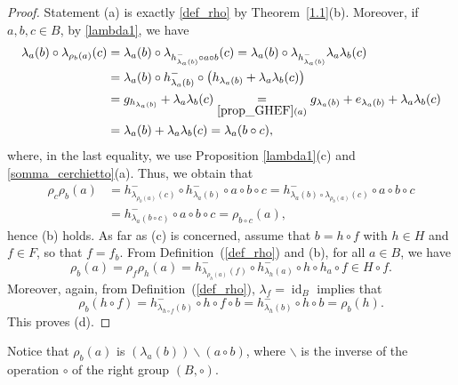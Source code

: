 \documentclass[11pt]{amsart}
\newcommand{\id}{\operatorname{id}}
\theoremstyle{definition}
\begin{document}
\begin{proof}
  Statement (a) is exactly \eqref{def_rho} by Theorem~\ref{1.1}(b). Moreover, if $a,b,c\in B$, by \cref{lambda1}, we have
    \begin{align*}
        \lambda_a(b) \circ \lambda_{\rho_b(a)}(c)&= \lambda_a(b)\circ \lambda_{h^-_{\lambda_a(b)}\circ a\circ b}(c)= \lambda_a(b)\circ 
        \lambda_{h^-_{\lambda_a(b)}}\lambda_a\lambda_b(c)\\
        &= \lambda_a(b)\circ h^-_{\lambda_a(b)}
        \circ\left(h_{\lambda_a(b)} + \lambda_a\lambda_b(c)\right)\\
        &= g_{h_{\lambda_a(b)}} + \lambda_a\lambda_b(c)%
        \underset{\eqref{prop_GHEF}(a)}{=} g_{\lambda_a(b)} + e_{\lambda_a(b)} +\lambda_a\lambda_b(c)\\
        &= \lambda_a(b) + \lambda_a\lambda_b(c)= \lambda_a(b\circ c),
    \end{align*}
   where, in the last equality, we use Proposition \ref{lambda1}(c) and \cref{somma_cerchietto}(a). Thus, we obtain that
    \begin{align*}
        \rho_c\rho_b(a)
        &=  h^-_{\lambda_{\rho_b(a)}(c)} \circ h^-_{\lambda_a(b)} \circ a \circ b \circ c
        =  h^-_{\lambda_a(b) \circ \lambda_{\rho_b(a)}(c)} \circ a \circ b \circ c\\
        &= h^-_{\lambda_a(b\circ c)}\circ a\circ b\circ c
        = \rho_{b\circ c}(a),
    \end{align*}
    hence (b) holds. As far as (c) is concerned, assume that $b=h\circ f$ with $h\in H$ and $f\in F$, so that $f=f_b$. From Definition~(\ref{def_rho}) and (b), for all $a \in B$, we have $$
    \rho_b(a)
    = \rho_f\rho_h(a)
    = h^-_{\lambda_{\rho_h(a)}(f)} \circ h^-_{\lambda_h(a)} \circ h \circ h_a\circ f \in H \circ f.
    $$  
    Moreover, again, from Definition~(\ref{def_rho}), $\lambda_{f}=\id_B$ implies that 
    $$\rho_b\left(h\circ f \right)=h^-_{\lambda_{h \circ f}(b)}\circ h \circ f \circ b=h^-_{\lambda_{h}(b)}\circ h \circ b=\rho_b(h).$$
    This proves (d).
\end{proof}

Notice that $\rho_b(a)$ is $ (\lambda_a(b))\backslash (a \circ b)$, where $\backslash$ is the inverse of the operation $\circ$ of the right group $(B,\circ)$.
\end{document}
